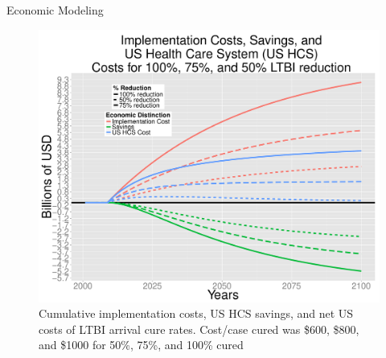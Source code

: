 \documentclass[final]{beamer}
\begin{document}
\begin{frame}
\begin{columns}[T]
\begin{column}{.3\textwidth}
\begin{block}{Economic Modeling}
\begin{figure}[h]
              \begin{minipage}[c]{0.6\textwidth}
                \includegraphics[height=0.7\textwidth, width=\textwidth]{EnLTBIRedGroupCost.pdf}
              \end{minipage}
              \hspace{0.5em}
              \begin{minipage}[c]{0.35\textwidth}
                \caption{Cumulative implementation costs, US HCS savings, and net
                       US costs of LTBI arrival cure rates. Cost/case cured was
                       \$600, \$800, and \$1000 for 50\%, 75\%, and 100\%
                       cured}
              \end{minipage}
              \label{fig:redEnLTBI_costs} 
            \end{figure}
      \end{block}
    \end{column}


\end{columns}
\end{frame}
\end{document}
